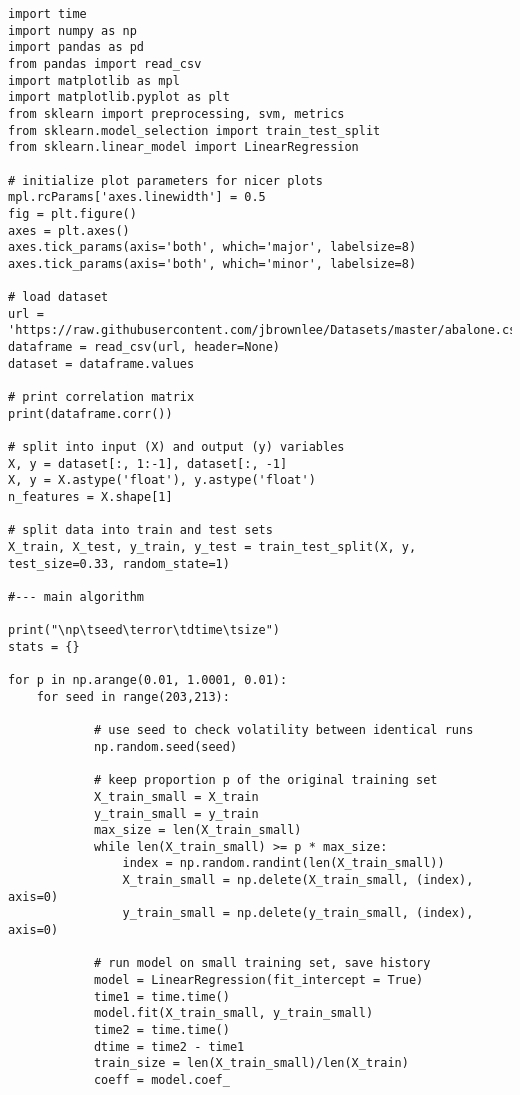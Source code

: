 \documentclass[oneside,10pt]{book}
\begin{document}
\begin{lstlisting}
import time
import numpy as np
import pandas as pd
from pandas import read_csv
import matplotlib as mpl
import matplotlib.pyplot as plt
from sklearn import preprocessing, svm, metrics
from sklearn.model_selection import train_test_split
from sklearn.linear_model import LinearRegression

# initialize plot parameters for nicer plots
mpl.rcParams['axes.linewidth'] = 0.5
fig = plt.figure() 
axes = plt.axes()
axes.tick_params(axis='both', which='major', labelsize=8)
axes.tick_params(axis='both', which='minor', labelsize=8)

# load dataset
url = 'https://raw.githubusercontent.com/jbrownlee/Datasets/master/abalone.csv'
dataframe = read_csv(url, header=None)
dataset = dataframe.values

# print correlation matrix
print(dataframe.corr()) 

# split into input (X) and output (y) variables
X, y = dataset[:, 1:-1], dataset[:, -1]
X, y = X.astype('float'), y.astype('float')
n_features = X.shape[1]

# split data into train and test sets
X_train, X_test, y_train, y_test = train_test_split(X, y, test_size=0.33, random_state=1)

#--- main algorithm

print("\np\tseed\terror\tdtime\tsize")
stats = {}

for p in np.arange(0.01, 1.0001, 0.01):
    for seed in range(203,213):

            # use seed to check volatility between identical runs
            np.random.seed(seed)     

            # keep proportion p of the original training set 
            X_train_small = X_train  
            y_train_small = y_train
            max_size = len(X_train_small)
            while len(X_train_small) >= p * max_size:
                index = np.random.randint(len(X_train_small))
                X_train_small = np.delete(X_train_small, (index), axis=0)
                y_train_small = np.delete(y_train_small, (index), axis=0)

            # run model on small training set, save history
            model = LinearRegression(fit_intercept = True)
            time1 = time.time()         
            model.fit(X_train_small, y_train_small)
            time2 = time.time()
            dtime = time2 - time1
            train_size = len(X_train_small)/len(X_train)
            coeff = model.coef_


\end{lstlisting}
\end{document}
